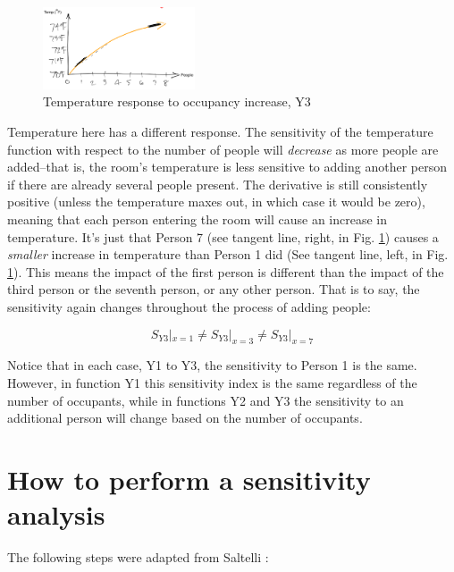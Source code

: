 \documentclass[10pt]{article}
\begin{document}
            \begin{figure}[h]
            \centering
            \includegraphics[width=4.5cm]{extras25/y3}
            \caption{Temperature response to occupancy increase, Y3}
            \label{Y3}
            \end{figure}

Temperature here has a different response. The sensitivity of the temperature function with respect to the number of people will \textit{decrease} as more people are added--that is, the room's temperature is less sensitive to adding another person if there are already several people present. The derivative is still consistently positive (unless the temperature maxes out, in which case it would be zero), meaning that each person entering the room will cause an increase in temperature. It's just that Person 7 (see tangent line, right, in Fig. \ref{Y3}) causes a \textit{smaller} increase in temperature than Person 1 did (See tangent line, left, in Fig. \ref{Y3}). This means the impact of the first person is different than the impact of the third person or the seventh person, or any other person. That is to say, the sensitivity again changes throughout the process of adding people:

$$ S_{Y3} |_{x=1} \neq S_{Y3}|_{x=3} \neq S_{Y3}|_{x=7} $$


Notice that in each case, Y1 to Y3, the sensitivity to Person 1 is the same. However, in function Y1 this sensitivity index is the same regardless of the number of occupants, while in functions Y2 and Y3 the sensitivity to an additional person will change based on the number of occupants.



\section{How to perform a sensitivity analysis}

The following steps were adapted from Saltelli \cite{Saltelli2009-tz}:
\end{document}

